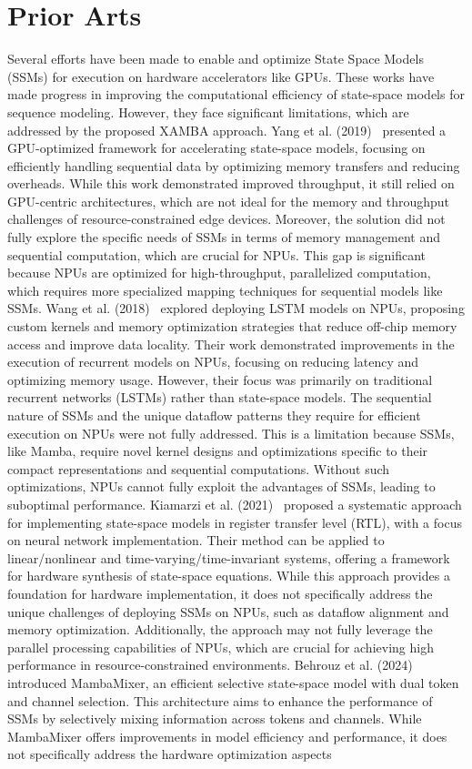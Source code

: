 \section{Prior Arts}\label{sec_prior_art}
Several efforts have been made to enable and optimize State Space Models (SSMs) for execution on hardware accelerators like GPUs. These works have made progress in improving the computational efficiency of state-space models for sequence modeling. However, they face significant limitations, which are addressed by the proposed XAMBA approach. Yang et al. (2019)~\cite{ssm_gpu} presented a GPU-optimized framework for accelerating state-space models, focusing on efficiently handling sequential data by optimizing memory transfers and reducing overheads. While this work demonstrated improved throughput, it still relied on GPU-centric architectures, which are not ideal for the memory and throughput challenges of resource-constrained edge devices. Moreover, the solution did not fully explore the specific needs of SSMs in terms of memory management and sequential computation, which are crucial for NPUs. This gap is significant because NPUs are optimized for high-throughput, parallelized computation, which requires more specialized mapping techniques for sequential models like SSMs. Wang et al. (2018)~\cite{rnn_npu} explored deploying LSTM models on NPUs, proposing custom kernels and memory optimization strategies that reduce off-chip memory access and improve data locality. Their work demonstrated improvements in the execution of recurrent models on NPUs, focusing on reducing latency and optimizing memory usage. However, their focus was primarily on traditional recurrent networks (LSTMs) rather than state-space models. The sequential nature of SSMs and the unique dataflow patterns they require for efficient execution on NPUs were not fully addressed. This is a limitation because SSMs, like Mamba, require novel kernel designs and optimizations specific to their compact representations and sequential computations. Without such optimizations, NPUs cannot fully exploit the advantages of SSMs, leading to suboptimal performance. Kiamarzi et al. (2021)~\cite{ssm_fpga} proposed a systematic approach for implementing state-space models in register transfer level (RTL), with a focus on neural network implementation. Their method can be applied to linear/nonlinear and time-varying/time-invariant systems, offering a framework for hardware synthesis of state-space equations. While this approach provides a foundation for hardware implementation, it does not specifically address the unique challenges of deploying SSMs on NPUs, such as dataflow alignment and memory optimization. Additionally, the approach may not fully leverage the parallel processing capabilities of NPUs, which are crucial for achieving high performance in resource-constrained environments. Behrouz et al. (2024)~\cite{mambamixer} introduced MambaMixer, an efficient selective state-space model with dual token and channel selection. This architecture aims to enhance the performance of SSMs by selectively mixing information across tokens and channels. While MambaMixer offers improvements in model efficiency and performance, it does not specifically address the hardware optimization aspects 